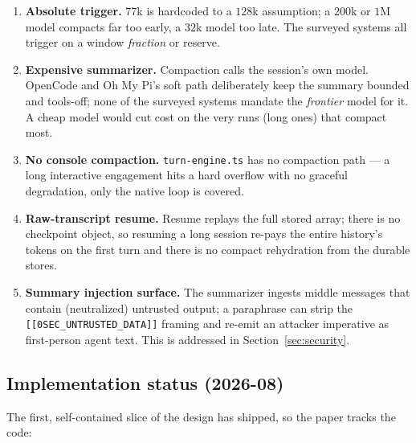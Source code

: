 \documentclass[11pt]{article}
\begin{document}
\begin{enumerate}[leftmargin=1.6em]
\item \textbf{Absolute trigger.} $77$k is hardcoded to a $128$k assumption; a
$200$k or $1$M model compacts far too early, a $32$k model too late. The
surveyed systems all trigger on a window \emph{fraction} or reserve.
\item \textbf{Expensive summarizer.} Compaction calls the session's own model.
OpenCode and Oh My Pi's soft path deliberately keep the summary bounded and
tools-off; none of the surveyed systems mandate the \emph{frontier} model for
it. A cheap model would cut cost on the very runs (long ones) that compact most.
\item \textbf{No console compaction.} \texttt{turn-engine.ts} has no compaction
path --- a long interactive engagement hits a hard overflow with no graceful
degradation, only the native loop is covered.
\item \textbf{Raw-transcript resume.} Resume replays the full stored array; there
is no checkpoint object, so resuming a long session re-pays the entire history's
tokens on the first turn and there is no compact rehydration from the durable
stores.
\item \textbf{Summary injection surface.} The summarizer ingests middle messages
that contain (neutralized) untrusted output; a paraphrase can strip the
\texttt{[[0SEC\_UNTRUSTED\_DATA]]} framing and re-emit an attacker imperative as
first-person agent text. This is addressed in Section~\ref{sec:security}.
\end{enumerate}

\subsection{Implementation status (2026-08)}

The first, self-contained slice of the design has shipped, so the paper tracks
the code:
\end{document}
